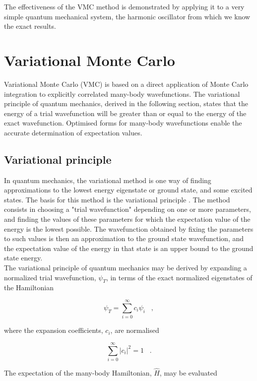 \documentclass{article}
\begin{document}
The effectiveness of the VMC method is demonstrated by applying it to a very simple quantum mechanical system, the harmonic oscillator from which we know the exact results.

\section{Variational Monte Carlo}
Variational Monte Carlo (VMC) is based on a direct application of Monte Carlo integration to explicitly correlated many-body wavefunctions. The variational principle of quantum mechanics, derived in the following section, states that the energy of a trial wavefunction will be greater than or equal to the energy of the exact wavefunction. Optimised forms for many-body wavefunctions enable the accurate determination of expectation values.

\subsection{Variational principle}
In quantum mechanics, the variational method is one way of finding approximations to the lowest energy eigenstate or ground state, and some excited states. The basis for this method is the variational principle \citep{griffiths1995introduction, sakurai1994modern}. The method consists in choosing a "trial wavefunction" depending on one or more parameters, and finding the values of these parameters for which the expectation value of the energy is the lowest possible. The wavefunction obtained by fixing the parameters to such values is then an approximation to the ground state wavefunction, and the expectation value of the energy in that state is an upper bound to the ground state energy.\\

The variational principle of quantum mechanics may be derived by expanding a normalized trial wavefunction, $\psi_{T}$, in terms of the exact normalized eigenstates of the Hamiltonian

\begin{equation}
 \psi_T=\sum_{i=0}^{\infty} c_{i} \psi_i \;\;\;,
\end{equation}

where the expansion coefficients, $c_{i}$, are normalised 

\begin{equation}
\sum_{i=0}^{\infty} \vert c_{i}\vert^2=1 \;\;\;.
\end{equation}

The expectation of the many-body Hamiltonian, $\hat{H}$, may be evaluated 
\end{document}
